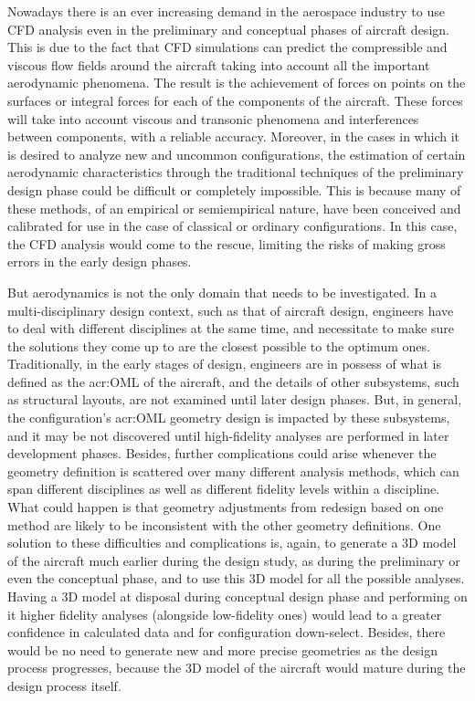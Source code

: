 \bigskip
\noindent
Nowadays there is an ever increasing demand in the aerospace industry to use \gls{CFD} analysis even in the preliminary and conceptual phases of aircraft design. This is due to the fact that \gls{CFD} simulations can predict the compressible and viscous flow fields around the aircraft taking into account all the important aerodynamic phenomena. The result is the achievement of forces on points on the surfaces or integral forces for each of the components of the aircraft. These forces will take into account viscous and transonic phenomena and interferences between components, with a reliable accuracy. Moreover, in the cases in which it is desired to analyze new and uncommon configurations, the estimation of certain aerodynamic characteristics through the traditional techniques of the preliminary design phase could be difficult or completely impossible. This is because many of these methods, of an empirical or semiempirical nature, have been conceived and calibrated for use in the case of classical or ordinary configurations. In this case, the \gls{CFD} analysis would come to the rescue, limiting the risks of making gross errors in the early design phases. \cite{paperCADinAero} 

\bigskip
\noindent
But aerodynamics is not the only domain that needs to be investigated. In a multi-disciplinary design context, such as that of aircraft design, engineers have to deal with different disciplines at the same time, and necessitate to make sure the solutions they come up to are the closest possible to the optimum ones. Traditionally, in the early stages of design, engineers are in possess of what is defined as the \gls{acr:OML} of the aircraft, and the details of other subsystems, such as structural layouts, are not examined until later design phases. But, in general, the configuration's \gls{acr:OML} geometry design is impacted by these subsystems, and it may be not discovered until high-fidelity analyses are performed in later development phases. Besides, further complications could arise whenever the geometry definition is scattered over many different analysis methods, which can span different disciplines as well as different fidelity levels within a discipline. What could happen is that geometry adjustments from redesign based on one method are likely to be inconsistent with the other geometry definitions. One solution to these difficulties and complications is, again, to generate a 3D model of the aircraft much earlier during the design study, as during the preliminary or even the conceptual phase, and to use this 3D model for all the possible analyses. Having a 3D model at disposal during conceptual design phase and performing on it higher fidelity analyses (alongside low-fidelity ones) would lead to a greater confidence in calculated data and for configuration down-select. Besides, there would be no need to generate new and more precise geometries as the design process progresses, because the 3D model of the aircraft would mature during the design process itself. \cite{AIAApaperHaimesDrela}

